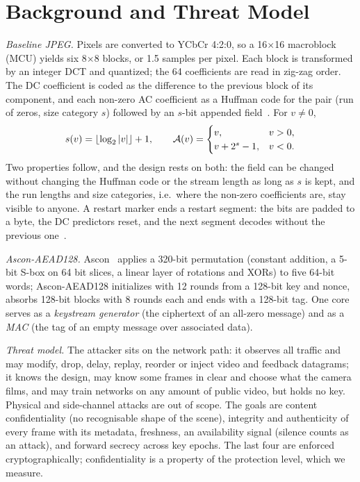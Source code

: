 \section{Background and Threat Model}\label{sec:background}
\textit{Baseline JPEG.} Pixels are converted to YCbCr 4:2:0, so a 16$\times$16 macroblock (MCU) yields six 8$\times$8 blocks, or 1.5 samples per pixel. Each block is transformed by an integer DCT and quantized; the 64 coefficients are read in zig-zag order. The DC coefficient is coded as the difference to the previous block of its component, and each non-zero AC coefficient as a Huffman code for the pair (run of zeros, size category $s$) followed by an $s$-bit appended field~\cite{t81,wallace1992}. For $v \ne 0$,
\begin{equation}
s(v) = \lfloor \log_2 |v| \rfloor + 1, \qquad
\mathcal{A}(v) = \begin{cases} v, & v > 0,\\ v + 2^s - 1, & v < 0. \end{cases}
\label{eq:amp}
\end{equation}
Two properties follow, and the design rests on both: the field can be changed without changing the Huffman code or the stream length as long as $s$ is kept, and the run lengths and size categories, i.e.\ where the non-zero coefficients are, stay visible to anyone. A restart marker ends a restart segment: the bits are padded to a byte, the DC predictors reset, and the next segment decodes without the previous one~\cite{t81}.

\textit{Ascon-AEAD128.} Ascon~\cite{ascon,sp800232} applies a 320-bit permutation (constant addition, a 5-bit S-box on 64 bit slices, a linear layer of rotations and XORs) to five 64-bit words; Ascon-AEAD128 initializes with 12 rounds from a 128-bit key and nonce, absorbs 128-bit blocks with 8 rounds each and ends with a 128-bit tag. One core serves as a \emph{keystream generator} (the ciphertext of an all-zero message) and as a \emph{MAC} (the tag of an empty message over associated data).

\textit{Threat model.} The attacker sits on the network path: it observes all traffic and may modify, drop, delay, replay, reorder or inject video and feedback datagrams; it knows the design, may know some frames in clear and choose what the camera films, and may train networks on any amount of public video, but holds no key. Physical and side-channel attacks are out of scope. The goals are content confidentiality (no recognisable shape of the scene), integrity and authenticity of every frame with its metadata, freshness, an availability signal (silence counts as an attack), and forward secrecy across key epochs. The last four are enforced cryptographically; confidentiality is a property of the protection level, which we measure.

